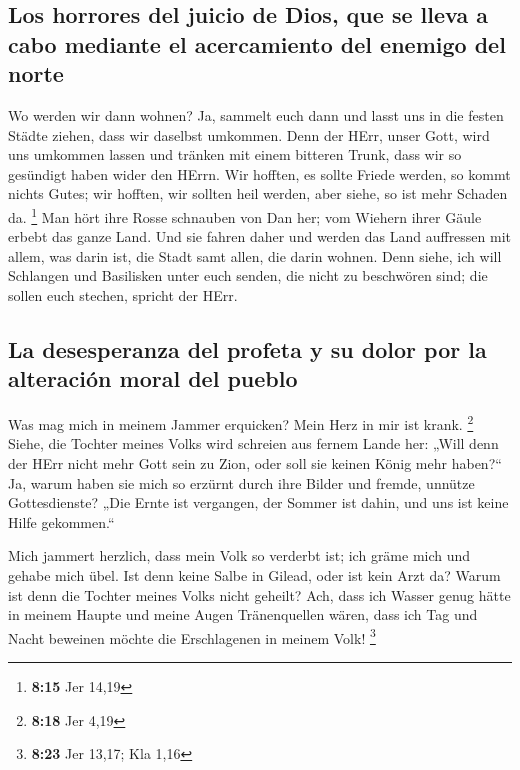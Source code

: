 \hypertarget{los-horrores-del-juicio-de-dios-que-se-lleva-a-cabo-mediante-el-acercamiento-del-enemigo-del-norte}{%
\subsection{Los horrores del juicio de Dios, que se lleva a cabo
mediante el acercamiento del enemigo del
norte}\label{los-horrores-del-juicio-de-dios-que-se-lleva-a-cabo-mediante-el-acercamiento-del-enemigo-del-norte}}

 Wo werden wir dann wohnen? Ja, sammelt euch dann und
lasst uns in die festen Städte ziehen, dass wir daselbst umkommen. Denn
der HErr, unser Gott, wird uns umkommen lassen und tränken mit einem
bitteren Trunk, dass wir so gesündigt haben wider den HErrn.
 Wir hofften, es sollte Friede werden, so kommt nichts
Gutes; wir hofften, wir sollten heil werden, aber siehe, so ist mehr
Schaden da. \footnote{\textbf{8:15} Jer 14,19}  Man hört
ihre Rosse schnauben von Dan her; vom Wiehern ihrer Gäule erbebt das
ganze Land. Und sie fahren daher und werden das Land auffressen mit
allem, was darin ist, die Stadt samt allen, die darin wohnen.
 Denn siehe, ich will Schlangen und Basilisken unter euch
senden, die nicht zu beschwören sind; die sollen euch stechen, spricht
der HErr.

\hypertarget{la-desesperanza-del-profeta-y-su-dolor-por-la-alteraciuxf3n-moral-del-pueblo}{%
\subsection{La desesperanza del profeta y su dolor por la alteración
moral del
pueblo}\label{la-desesperanza-del-profeta-y-su-dolor-por-la-alteraciuxf3n-moral-del-pueblo}}

 Was mag mich in meinem Jammer erquicken? Mein Herz in
mir ist krank. \footnote{\textbf{8:18} Jer 4,19}  Siehe,
die Tochter meines Volks wird schreien aus fernem Lande her: „Will denn
der HErr nicht mehr Gott sein zu Zion, oder soll sie keinen König mehr
haben?{}`` Ja, warum haben sie mich so erzürnt durch ihre Bilder und
fremde, unnütze Gottesdienste?  „Die Ernte ist vergangen,
der Sommer ist dahin, und uns ist keine Hilfe gekommen.``

 Mich jammert herzlich, dass mein Volk so verderbt ist;
ich gräme mich und gehabe mich übel.  Ist denn keine
Salbe in Gilead, oder ist kein Arzt da? Warum ist denn die Tochter
meines Volks nicht geheilt?  Ach, dass ich Wasser genug
hätte in meinem Haupte und meine Augen Tränenquellen wären, dass ich Tag
und Nacht beweinen möchte die Erschlagenen in meinem Volk! \footnote{\textbf{8:23}
  Jer 13,17; Kla 1,16}

